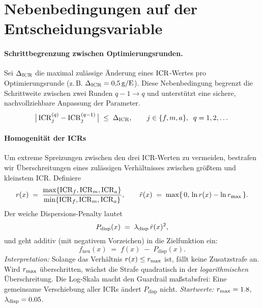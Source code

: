 \section{Nebenbedingungen auf der Entscheidungsvariable}


\paragraph{Schrittbegrenzung zwischen Optimierungsrunden.} Sei \(\Delta_{\mathrm{ICR}}\) die maximal zulässige Änderung eines \(\mathrm{ICR}\)-Wertes pro Optimierungsrunde (z.\,B. \(\Delta_{\mathrm{ICR}}=0{,}5\,\mathrm{g}/\mathrm{E}\)). Diese Nebenbedingung begrenzt die Schrittweite zwischen zwei Runden \(q-1 \to q\) und unterstützt eine sichere, nachvollziehbare Anpassung der Parameter.
\[
\bigl|\,\mathrm{ICR}_j^{(q)} - \mathrm{ICR}_j^{(q-1)}\,\bigr| \;\le\; \Delta_{\mathrm{ICR}},
\qquad j \in \{f,m,a\},\;\; q=1,2,\dots
\]

\medskip

\paragraph{Homogenität der ICRs}
Um extreme Spreizungen zwischen den drei ICR-Werten zu vermeiden, bestrafen wir
Überschreitungen eines zulässigen Verhältnisses zwischen größtem und kleinstem ICR.
Definiere
\[
r(x)\;=\;\frac{\max\{\mathrm{ICR}_f,\mathrm{ICR}_m,\mathrm{ICR}_a\}}{\min\{\mathrm{ICR}_f,\mathrm{ICR}_m,\mathrm{ICR}_a\}},
\qquad
\tilde r(x)\;=\;\max\{\,0,\,\ln r(x)-\ln r_{\max}\,\}.
\]
Der weiche Dispersions-Penalty lautet
\[
P_{\mathrm{disp}}(x)\;=\;\lambda_{\mathrm{disp}}\,\tilde r(x)^{2},
\]
und geht additiv (mit negativem Vorzeichen) in die Zielfunktion ein:
\[
f_{\text{neu}}(x)\;=\;f(x)\;-\;P_{\mathrm{disp}}(x).
\]
\noindent
\textit{Interpretation:} Solange das Verhältnis \(r(x)\le r_{\max}\) ist, fällt keine Zusatzstrafe an.
Wird \(r_{\max}\) überschritten, wächst die Strafe quadratisch in der \emph{logarithmischen} Überschreitung.
Die Log-Skala macht den Guardrail maßstabsfrei: Eine gemeinsame Verschiebung aller ICRs
ändert \(P_{\mathrm{disp}}\) nicht. \textit{Startwerte:} \(r_{\max}=1.8\), \(\lambda_{\mathrm{disp}}=0.05\).